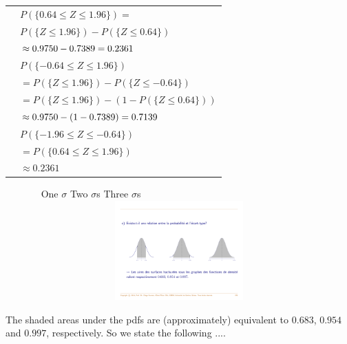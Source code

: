 \documentclass[smaller]{beamer}\usepackage[]{graphicx}\usepackage[]{color}
\begin{document}
\begin{frame}{\subsecname}
  
  \begin{example}[continued]
  \begin{footnotesize}
  \begin{tabular}{ll}
  & $P(\{0.64\leq Z\leq 1.96\})=$ \\
  & $P(\{Z\leq 1.96\})-P(\{Z\leq 0.64\})$ \\
  & $\approx 0.9750-0.7389=0.2361\bigskip $ \\
  & $P(\{-0.64\leq Z\leq 1.96\})$ \\
  & $=P(\{Z\leq 1.96\})-P(\{Z\leq -0.64\})$ \\
  & $=P(\{Z\leq 1.96\})-(1-P(\{Z\leq 0.64\}))$ \\
  & $\approx0.9750-(1-0.7389)=0.7139\bigskip $ \\
  & $P(\{-1.96\leq Z\leq -0.64\})$ \\
  & $=P(\{0.64\leq Z\leq 1.96\})$ \\
  & $\approx0.2361$%
  \end{tabular}
  \end{footnotesize}
  \end{example}
\end{frame}%

\begin{frame}{\subsecname}
  \begin{figure}[ptb]\centering
  \ \hspace{0.6cm} One $\sigma$ \hspace{2.4cm} Two $\sigma$s \hspace{2.5cm} Three $\sigma$s \hspace{3cm}
  \includegraphics[height=1.5in, width=4.5in]{img/Areas_Normal.pdf}%
  \end{figure}%
  The shaded areas under the pdfs are (approximately) equivalent to $0.683$, $0.954$ and $0.997$,
  respectively. So we state  the following ....
\end{frame}
\end{document}
